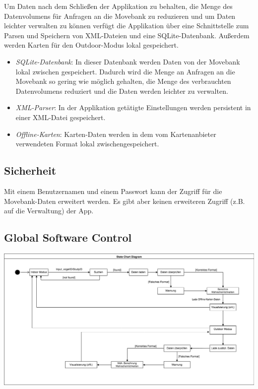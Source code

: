 \documentclass[12pt]{article} %
\begin{document}
Um Daten nach dem Schließen der Applikation zu behalten, die Menge des Datenvolumens für Anfragen an die Movebank zu reduzieren und um Daten leichter verwalten zu können verfügt die Applikation über eine Schnittstelle zum Parsen und Speichern von XML-Dateien und eine SQLite-Datenbank. Außerdem werden Karten für den Outdoor-Modus lokal gespeichert.

\begin{itemize}
	\item \textit{SQLite-Datenbank}: In dieser Datenbank werden Daten von der Movebank lokal zwischen gespeichert. Dadurch wird die Menge an Anfragen an die Movebank so gering wie möglich gehalten, die Menge des verbrauchten Datenvolumens reduziert und die Daten werden leichter zu verwalten.
	
	\item \textit{XML-Parser}: In der Applikation getätigte Einstellungen werden persistent in einer XML-Datei gespeichert.
	
	\item \textit{Offline-Karten}: Karten-Daten werden in dem vom Kartenanbieter verwendeten Format lokal zwischengespeichert.
	
	
\end{itemize}



\subsection{Sicherheit}
Mit einem Benutzernamen und einem Passwort kann der Zugriff für die Movebank-Daten erweitert werden. Es gibt aber keinen erweiteren Zugriff (z.B. auf die Verwaltung) der App. 


\subsection{Global Software Control}

\includegraphics[width = \textwidth]{Diagramme/state_diagram.png}
\end{document}
